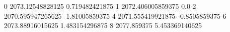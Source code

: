 0 2073.12548828125 0.719482421875
1 2072.406005859375 0.0
2 2070.595947265625 -1.81005859375
4 2071.555419921875 -0.8505859375
6 2073.88916015625 1.483154296875
8 2077.859375 5.453369140625
